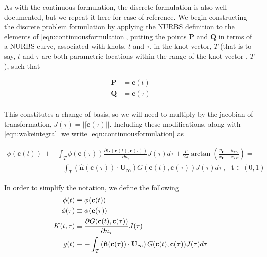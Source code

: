 As with the continuous formulation, the discrete formulation is also well documented,\cite{Politis2014, Kostas2017Shape-optimizat} but we repeat it here for ease of reference. We begin constructing the discrete problem formulation by applying the NURBS definition to the elements of \cref{eqn:continuousformulation}, putting the points $\mathbf{P}$ and $\mathbf{Q}$ in terms of a NURBS curve, associated with knots, $t$ and $\tau$, in the knot vector, $T$ (that is to say, $t$ and $\tau$ are both parametric locations within the range of the knot vector , $T$), such that

\begin{equation}
\begin{aligned}
\mathbf{P} &= \mathbf{c}(t)\\
\mathbf{Q} &= \mathbf{c}(\tau)\\
\end{aligned}
\end{equation}

This constitutes a change of basis, so we will need to multiply by the jacobian of transformation, \(J(\tau) = ||\dot{\mathbf{c}}(\tau)||\). Including these modifications, along with \cref{eqn:wakeintegral} we write \cref{eqn:continuousformulation} as

\begin{equation}
\begin{aligned}
\label{eqn:discreteformulationlong}
\phi(\mathbf{c}(t))~+ &\int_{T} \phi(\mathbf{c}(\tau))\frac{\partial G(\mathbf{c}(t),\mathbf{c}(\tau))}{\partial n_\tau} J(\tau) d\tau +  \frac{\Gamma}{2\pi} \arctan\left( \frac{y_{\mathbf{P}} - y_{TE}}{x_{\mathbf{P}}-x_{TE}} \right) =\\
&- \int_{T} \left(\mathbf{\hat{n}}(\mathbf{c}(\tau)) \cdot  \mathbf{U}_{\infty} \right) G(\mathbf{c}(t),\mathbf{c}(\tau))J(\tau) d\tau~, ~~~\mathbf{t} \in (0,1)
\end{aligned}
\end{equation}

\noindent In order to simplify the notation, we define the following
\begin{equation}
\centering
\begin{aligned}
\label{eqn:simplenotation}
\phi(t) &\equiv \phi(\mathbf{c}(t))\\
\phi(\tau) &\equiv \phi(\mathbf{c}(\tau))\\
K(t,\tau) &\equiv \frac{\partial G(\mathbf{c}(t),\mathbf{c}(\tau))}{\partial n_\tau}J(\tau)\\
g(t) &\equiv -\int_{T} \left(\mathbf{\hat{n}}(\mathbf{c}(\tau)) \cdot  \mathbf{U}_{\infty} \right) G(\mathbf{c}(t),\mathbf{c}(\tau))J(\tau) d\tau \\
\end{aligned}
\end{equation}

